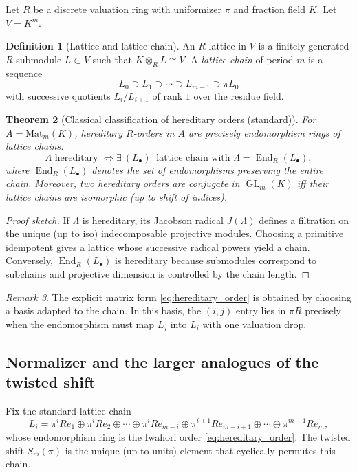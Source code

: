 \documentclass[11pt,oneside]{amsbook}
\numberwithin{equation}{section}
\theoremstyle{plain}
\newtheorem{theorem}{Theorem}[section]
\theoremstyle{definition}
\newtheorem{definition}[theorem]{Definition}
\theoremstyle{remark}
\newtheorem{remark}[theorem]{Remark}
\DeclareMathOperator{\End}{\mathrm{End}}
\DeclareMathOperator{\GL}{\mathrm{GL}}
\begin{document}
Let $R$ be a discrete valuation ring with uniformizer $\pi$ and fraction field $K$.
Let $V=K^m$.

\begin{definition}[Lattice and lattice chain]
An $R$-lattice in $V$ is a finitely generated $R$-submodule $L\subset V$ such that $K\otimes_R L\cong V$.
A \emph{lattice chain} of period $m$ is a sequence
\[
L_0 \supset L_1 \supset \cdots \supset L_{m-1} \supset \pi L_0
\]
with successive quotients $L_i/L_{i+1}$ of rank $1$ over the residue field.
\end{definition}

\begin{theorem}[Classical classification of hereditary orders (standard)]
\label{thm:hereditary_classification}
For $A=\mathrm{Mat}_m(K)$, hereditary $R$-orders in $A$ are precisely endomorphism rings of lattice chains:
\[
\Lambda \text{ hereditary } \Longleftrightarrow \exists\ (L_\bullet)\ \text{ lattice chain with }\Lambda=\End_R(L_\bullet),
\]
where $\End_R(L_\bullet)$ denotes the set of endomorphisms preserving the entire chain.
Moreover, two hereditary orders are conjugate in $\GL_m(K)$ iff their lattice chains are isomorphic (up to shift of indices).
\end{theorem}

\begin{proof}[Proof sketch]
If $\Lambda$ is hereditary, its Jacobson radical $J(\Lambda)$ defines a filtration on the unique (up to iso) indecomposable projective modules.
Choosing a primitive idempotent gives a lattice whose successive radical powers yield a chain.
Conversely, $\End_R(L_\bullet)$ is hereditary because submodules correspond to subchains and projective dimension is controlled by the chain length.
\end{proof}

\begin{remark}
The explicit matrix form \eqref{eq:hereditary_order} is obtained by choosing a basis adapted to the chain.
In this basis, the $(i,j)$ entry lies in $\pi R$ precisely when the endomorphism must map $L_j$ into $L_{i}$ with one valuation drop.
\end{remark}

\subsection{Normalizer and the larger analogues of the twisted shift}
\label{sec:normalizer_shifts}

Fix the standard lattice chain
\[
L_i = \pi^i R e_1 \oplus \pi^i R e_2 \oplus \cdots \oplus \pi^i R e_{m-i}
\oplus \pi^{i+1}R e_{m-i+1}\oplus \cdots \oplus \pi^{m-1}R e_m,
\]
whose endomorphism ring is the Iwahori order \eqref{eq:hereditary_order}.
The twisted shift $S_m(\pi)$ is the unique (up to units) element that cyclically permutes this chain.
\end{document}
